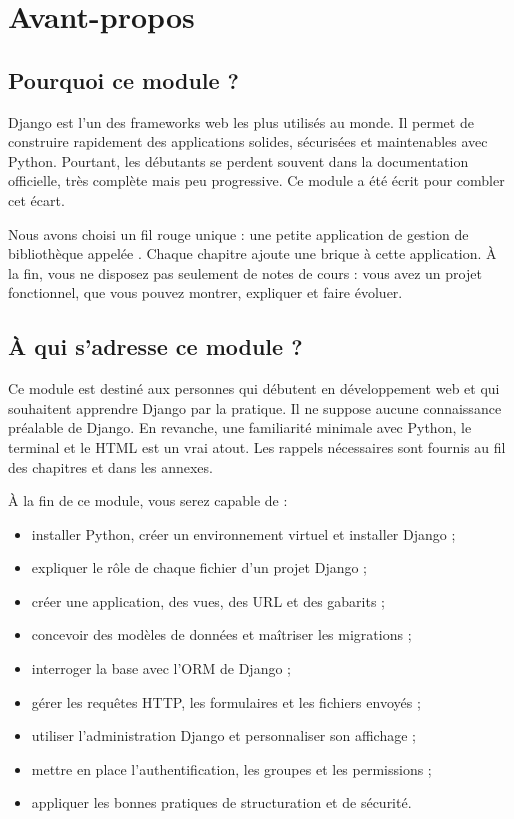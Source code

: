 \chapter*{Avant-propos}

\section*{Pourquoi ce module ?}

Django est l'un des frameworks web les plus utilisés au monde. Il permet de construire
rapidement des applications solides, sécurisées et maintenables avec Python. Pourtant,
les débutants se perdent souvent dans la documentation officielle, très complète mais
peu progressive. Ce module a été écrit pour combler cet écart.

Nous avons choisi un fil rouge unique : une petite application de gestion de
bibliothèque appelée \gesibiblio. Chaque chapitre ajoute une brique à cette
application. À la fin, vous ne disposez pas seulement de notes de cours : vous avez
un projet fonctionnel, que vous pouvez montrer, expliquer et faire évoluer.

\section*{À qui s'adresse ce module ?}

Ce module est destiné aux personnes qui débutent en développement web et qui
souhaitent apprendre Django par la pratique. Il ne suppose aucune connaissance
préalable de Django. En revanche, une familiarité minimale avec Python, le terminal
et le HTML est un vrai atout. Les rappels nécessaires sont fournis au fil des
chapitres et dans les annexes.

\begin{objectifs}
À la fin de ce module, vous serez capable de :
\begin{itemize}
  \item installer Python, créer un environnement virtuel et installer Django ;
  \item expliquer le rôle de chaque fichier d'un projet Django ;
  \item créer une application, des vues, des URL et des gabarits ;
  \item concevoir des modèles de données et maîtriser les migrations ;
  \item interroger la base avec l'ORM de Django ;
  \item gérer les requêtes HTTP, les formulaires et les fichiers envoyés ;
  \item utiliser l'administration Django et personnaliser son affichage ;
  \item mettre en place l'authentification, les groupes et les permissions ;
  \item appliquer les bonnes pratiques de structuration et de sécurité.
\end{itemize}
\end{objectifs}

